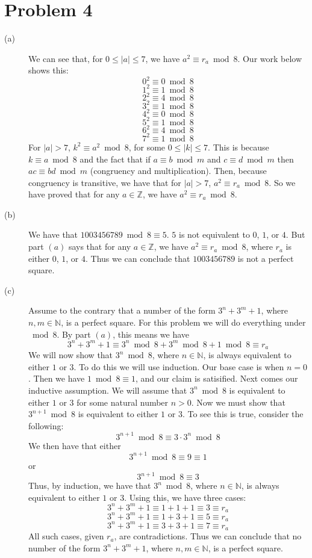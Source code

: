 \documentclass{article}
\begin{document}
\section*{Problem 4}
\begin{description}
    \item[(a)] We can see that, for $0 \leq |a| \leq 7$, we have $a^2
        \equiv r_a \bmod 8$. Our work below shows this:
        \[ 0^2 \equiv 0 \bmod 8 \]
        \[ 1^2 \equiv 1 \bmod 8 \]
        \[ 2^2 \equiv 4 \bmod 8 \]
        \[ 3^2 \equiv 1 \bmod 8 \]
        \[ 4^2 \equiv 0 \bmod 8 \]
        \[ 5^2 \equiv 1 \bmod 8 \]
        \[ 6^2 \equiv 4 \bmod 8 \]
        \[ 7^2 \equiv 1 \bmod 8 \]
        For $|a| > 7$, $k^2 \equiv a^2 \bmod 8$, for some $0 \leq |k| \leq 7$.
        This is because $k \equiv a \bmod 8$ and the fact that if $a \equiv b \bmod
        m$ and $c \equiv d \bmod m$ then $ac \equiv bd \bmod m$ (congruency and
        multiplication). Then, because congruency is transitive, we have
        that for $|a| > 7$, $a^2 \equiv r_a \bmod 8$. So we have proved
        that for any $a \in \mathbb{Z}$, we have $a^2 \equiv r_a \bmod 8$.
    \item[(b)] We have that $1003456789 \bmod 8 \equiv 5$. $5$ is not equivalent to
        $0$, $1$, or $4$. But part $(a)$ says that for any $a \in \mathbb{Z}$,
        we have $a^2 \equiv r_a \bmod 8$, where $r_a$ is either $0$, $1$, or $4$.
        Thus we can conclude that $1003456789$ is not a perfect square.
    \item[(c)] Assume to the contrary that a number of the form
        $3^n + 3^m + 1$, where $n,m \in \mathbb{N}$, is a perfect square.
        For this problem we will do everything under $\bmod 8$.
        By part $(a)$, this means we have
        \[ 3^n + 3^m + 1 \equiv 3^n \bmod 8 + 3^m \bmod 8 + 1 \bmod 8 \equiv
            r_a \]
        We will now show that $3^n \bmod 8$, where $n \in \mathbb{N}$, is
        always equivalent to either $1$ or $3$. To do this we will use induction.
        Our base case is when $n=0$. Then we have $1 \bmod 8 \equiv 1$, and our
        claim is satisified. Next comes our inductive assumption. We will
        assume that $3^n \bmod 8$ is equivalent to either $1$ or $3$ for some
        natural number
        $n > 0$. Now we must show that $3^{n+1} \bmod 8$ is equivalent
        to either $1$ or $3$.  To see this is true, consider the following:
        \[ 3^{n+1} \bmod 8 \equiv 3 \cdot 3^n \bmod 8 \]
        We then have that either
        \[ 3^{n+1} \bmod 8 \equiv 9 \equiv 1 \]
        or
        \[ 3^{n+1} \bmod 8 \equiv 3 \]
        Thus, by induction, we have that $3^n \bmod 8$, where $n \in \mathbb{N}$,
        is always equivalent to either $1$ or $3$. Using this, we have
        three cases:
        \[ 3^n + 3^m + 1 \equiv 1+1+1 \equiv 3 \equiv r_a \]
        \[ 3^n + 3^m + 1 \equiv 1+3+1 \equiv 5 \equiv r_a \]
        \[ 3^n + 3^m + 1 \equiv 3+3+1 \equiv 7 \equiv r_a \]
        All such cases, given $r_a$, are contradictions. Thus we can conclude
        that no number of the form $3^n + 3^m + 1$, where $n,m \in \mathbb{N}$,
        is a perfect square.
\end{description}
\end{document}
